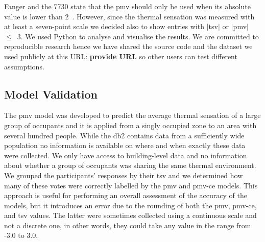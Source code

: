 Fanger and the \gls{7730} state that the \ac{pmv} should only be used when its absolute value is lower than 2~\cite{Fanger1970, iso7730}.
However, since the thermal sensation was measured with at least a seven-point scale we decided also to show entries with $|$\ac{tsv}$|$ or $|$\ac{pmv}$|$~$\leq$~\num{3}.
We used Python to analyse and visualise the results.
We are committed to reproducible research hence we have shared the source code and the dataset we used publicly at this URL: \textbf{provide URL} so other users can test different assumptions.  

\subsection{Model Validation}\label{subsec:model-validation}
The \ac{pmv} model was developed to predict the average thermal sensation of a large group of occupants and it is applied from a singly occupied zone to an area with several hundred people.
While the \ac{db2} contains data from a sufficiently wide population no information is available on where and when exactly these data were collected.
We only have access to building-level data and no information about whether a group of occupants was sharing the same thermal environment.
We grouped the participants' responses by their \ac{tsv} and we determined how many of these votes were correctly labelled by the \ac{pmv} and \ac{pmv-ce} models.
This approach is useful for performing an overall assessment of the accuracy of the models, but it introduces an error due to the rounding of both the \ac{pmv}, \ac{pmv-ce}, and \ac{tsv} values.
The latter were sometimes collected using a continuous scale and not a discrete one, in other words, they could take any value in the range from -3.0 to 3.0.


